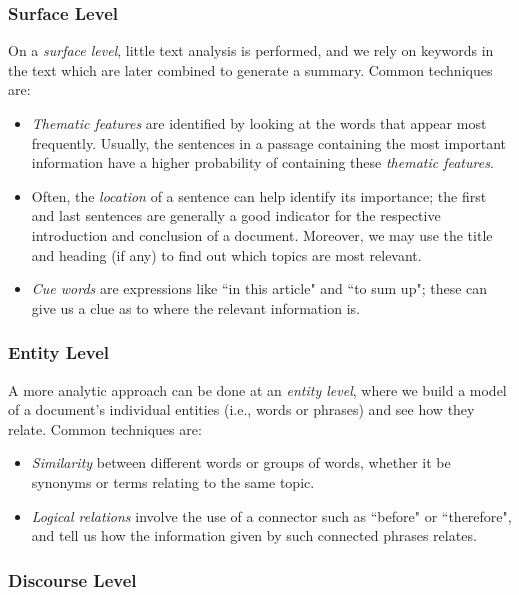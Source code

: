 \subsubsection*{Surface Level}

On a \textit{surface level}, little text analysis is performed, and we rely on keywords in the text which are later combined to generate a summary. Common techniques are:

\begin{itemize}
\item \textit{Thematic features} are identified by looking at the words that appear most frequently. Usually, the sentences in a passage containing the most important information have a higher probability of containing these \textit{thematic features}.
\item Often, the \textit{location} of a sentence can help identify its importance; the first and last sentences are generally a good indicator for the respective introduction and conclusion of a document. Moreover, we may use the title and heading (if any) to find out which topics are most relevant.
\item \textit{Cue words} are expressions like ``in this article" and ``to sum up"; these can give us a clue as to where the relevant information is.
\end{itemize}

\subsubsection*{Entity Level}

A more analytic approach can be done at an \textit{entity level}, where we build a model of a document's individual entities (i.e., words or phrases) and see how they relate. Common techniques are:

\begin{itemize}
\item \textit{Similarity} between different words or groups of words, whether it be synonyms or terms relating to the same topic.
\item \textit{Logical relations} involve the use of a connector such as ``before" or ``therefore", and tell us how the information given by such connected phrases relates.
\end{itemize}

\subsubsection*{Discourse Level}

